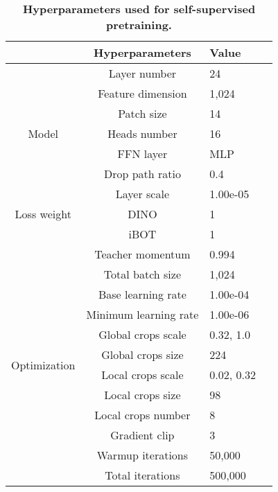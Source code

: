 \newpage
\begin{table}[h] 
\renewcommand{\arraystretch}{1.5}
\renewcommand{\tablename}{Extended Data Table.}
\centering 
\caption{\textbf{Hyperparameters used for self-supervised pretraining.}}

\begin{tabular}{c|c|p{2cm}c} 
\hline 
 \rowcolor{cusyellow} & \textbf{Hyperparameters} & \textbf{Value} \\
\hline 
\multirow{7}{*}{Model} & Layer number  & 24 \\
& Feature dimension & 1,024 \\
& Patch size & 14 \\
& Heads number & 16 \\
& FFN layer & MLP \\
& Drop path ratio & 0.4 \\
& Layer scale  & 1.00e-05 \\
\hline 
 \rowcolor{cusyellowl} Loss weight & DINO & 1 \\
 \rowcolor{cusyellowl}& iBOT & 1 \\
\hline 
\multirow{12}{*}{Optimization} & Teacher momentum & 0.994\\
& Total batch size & 1,024 \\
& Base learning rate & 1.00e-04 \\
& Minimum learning rate & 1.00e-06 \\
& Global crops scale & 0.32, 1.0 \\
& Global crops size & 224 \\
& Local crops scale & 0.02, 0.32 \\
& Local crops size & 98 \\
& Local crops number & 8 \\
& Gradient clip & 3\\
& Warmup iterations & 50,000 \\
& Total iterations & 500,000\\ 
\hline 
\end{tabular} 
\label{ST_pretrain_para}
\end{table}

